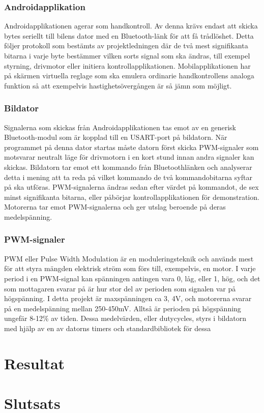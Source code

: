 \documentclass[a4paper]{article}
\begin{document}
\subsubsection{Androidapplikation}
Androidapplikationen agerar som handkontroll. Av denna krävs endast att skicka bytes seriellt till bilens dator med en Bluetooth-länk för att få trådlöshet. Detta följer protokoll som bestämts av projektledningen där de två mest signifikanta bitarna i varje byte bestämmer vilken sorts signal som ska ändras, till exempel styrning, drivmotor eller initiera kontrollapplikationen. Mobilapplikationen har på skärmen virtuella reglage som ska emulera ordinarie handkontrollens analoga funktion så att exempelvis hastighetsövergången är så jämn som möjligt. 

\subsubsection{Bildator}
Signalerna som skickas från Androidapplikationen tas emot av en generisk Bluetooth-modul som är kopplad till en USART-port på bildatorn. När programmet på denna dator startas måste datorn först skicka PWM-signaler som motsvarar neutralt läge för drivmotorn i en kort stund innan andra signaler kan skickas. Bildatorn tar emot ett kommando från Bluetoothlänken och analyserar detta i mening att ta reda på vilket kommando de två kommandobitarna syftar på ska utföras. PWM-signalerna ändras sedan efter värdet på kommandot, de sex minst signifikanta bitarna, eller påbörjar kontrollapplikationen för demonstration. Motorerna tar emot PWM-signalerna och ger utslag beroende på deras medelspänning.

\subsubsection{PWM-signaler}
PWM eller Pulse Width Modulation är en moduleringsteknik och används mest för att styra mängden elektrisk ström som förs till, exempelvis, en motor. I varje period i en PWM-signal kan spänningen antingen vara 0, låg, eller 1, hög, och det som mottagaren svarar på är hur stor del av perioden som signalen var på högspänning. I detta projekt är maxspänningen ca 3, 4V, och motorerna svarar på en medelspänning mellan 250-450mV. Alltså är perioden på högspänning ungefär 8-12\% av tiden. Dessa medelvärden, eller dutycycles, styrs i bildatorn med hjälp av en av datorns timers och standardbibliotek för dessa



\section{Resultat}




\section{Slutsats}



\newpage


\end{document}
